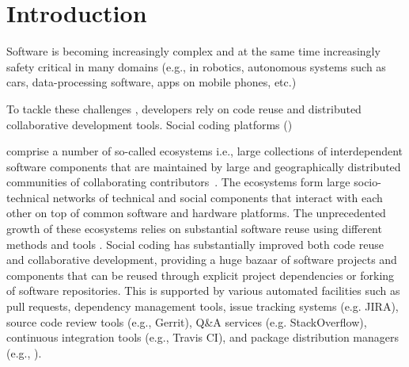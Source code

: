 \section{Introduction}
Software is becoming increasingly complex and at the same time increasingly safety critical in many domains (e.g., in robotics, autonomous systems such as cars, data-processing software, apps on mobile phones, etc.)

To tackle these challenges , developers rely on code reuse and distributed collaborative development tools.
Social coding platforms (\scp)

 comprise a number of so-called ecosystems
  i.e., large collections of interdependent software components that are maintained by large and geographically distributed communities of collaborating contributors~\cite{lungu:2008,decan:2017}.
The ecosystems form large socio-technical networks of technical and social components that interact with each other on top of common software and hardware platforms.
The unprecedented growth of these ecosystems relies on substantial software reuse using different methods and tools \cite{mojica2014large}.
Social coding has substantially improved  both code reuse and collaborative development, providing a huge bazaar of software projects and components that can be reused through explicit project dependencies or forking of software repositories. This is supported by various automated facilities such as pull requests, dependency management tools, issue tracking systems (e.g. \textsf{JIRA}), source code review tools (e.g., \textsf{Gerrit}), Q\&A services (e.g. \textsf{StackOverflow}), continuous integration tools (e.g., \textsf{Travis CI}), and package distribution managers (e.g., \np).

